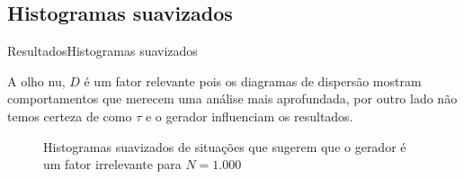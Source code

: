 \documentclass[10pt,xcolor={dvipsnames}]{beamer}
\begin{document}
\subsection{Histogramas suavizados}
\begin{frame}{Resultados}{Histogramas suavizados}
\begin{block}{}
	A olho nu, $D$ é um fator relevante pois os diagramas de dispersão mostram comportamentos que merecem uma análise mais aprofundada, por outro lado não temos certeza de como $\tau$ e o gerador influenciam os resultados. 
	\begin{figure} %
		\centering
		\caption{Histogramas suavizados de situações que sugerem que o gerador é um fator irrelevante para $N=1.000$}\label{fig:GeradorIrrelevante1k}
	\end{figure}
\end{block}
\end{frame}
\end{document}
